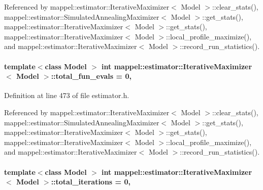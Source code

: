Referenced by mappel\+::estimator\+::\+Iterative\+Maximizer$<$ Model $>$\+::clear\+\_\+stats(), mappel\+::estimator\+::\+Simulated\+Annealing\+Maximizer$<$ Model $>$\+::get\+\_\+stats(), mappel\+::estimator\+::\+Iterative\+Maximizer$<$ Model $>$\+::get\+\_\+stats(), mappel\+::estimator\+::\+Iterative\+Maximizer$<$ Model $>$\+::local\+\_\+profile\+\_\+maximize(), and mappel\+::estimator\+::\+Iterative\+Maximizer$<$ Model $>$\+::record\+\_\+run\+\_\+statistics().

\paragraph[{\texorpdfstring{total\+\_\+fun\+\_\+evals}{total_fun_evals}}]{\setlength{\rightskip}{0pt plus 5cm}template$<$class Model $>$ int {\bf mappel\+::estimator\+::\+Iterative\+Maximizer}$<$ Model $>$\+::total\+\_\+fun\+\_\+evals = 0\hspace{0.3cm}{\ttfamily [protected]}, {\ttfamily [inherited]}}\hypertarget{classmappel_1_1estimator_1_1IterativeMaximizer_aa4f49112ff3b145fa1096a7ac4d48af7}{}\label{classmappel_1_1estimator_1_1IterativeMaximizer_aa4f49112ff3b145fa1096a7ac4d48af7}


Definition at line 473 of file estimator.\+h.



Referenced by mappel\+::estimator\+::\+Iterative\+Maximizer$<$ Model $>$\+::clear\+\_\+stats(), mappel\+::estimator\+::\+Simulated\+Annealing\+Maximizer$<$ Model $>$\+::get\+\_\+stats(), mappel\+::estimator\+::\+Iterative\+Maximizer$<$ Model $>$\+::get\+\_\+stats(), mappel\+::estimator\+::\+Iterative\+Maximizer$<$ Model $>$\+::local\+\_\+profile\+\_\+maximize(), and mappel\+::estimator\+::\+Iterative\+Maximizer$<$ Model $>$\+::record\+\_\+run\+\_\+statistics().

\paragraph[{\texorpdfstring{total\+\_\+iterations}{total_iterations}}]{\setlength{\rightskip}{0pt plus 5cm}template$<$class Model $>$ int {\bf mappel\+::estimator\+::\+Iterative\+Maximizer}$<$ Model $>$\+::total\+\_\+iterations = 0\hspace{0.3cm}{\ttfamily [protected]}, {\ttfamily [inherited]}}\hypertarget{classmappel_1_1estimator_1_1IterativeMaximizer_a14a3683e595e1db79b9cbc49b0d8688e}{}\label{classmappel_1_1estimator_1_1IterativeMaximizer_a14a3683e595e1db79b9cbc49b0d8688e}


